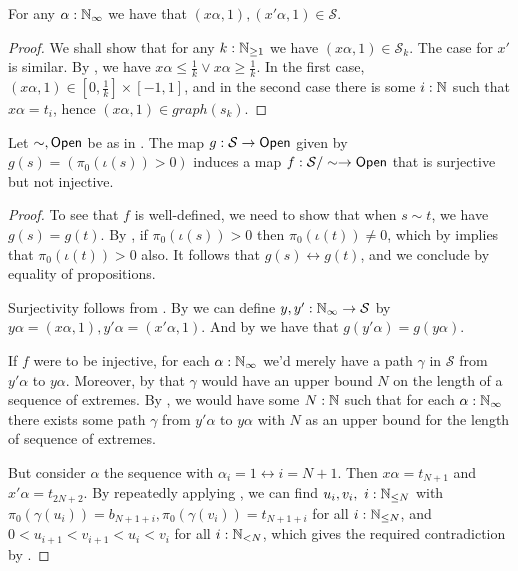 \begin{lemma}\label{sequenceLandsInS}
  For any $\alpha:\mathbb{N}_{\infty}$ we have that $(x\alpha,1),(x'\alpha,1) \in \mathcal S$.
\end{lemma}
\begin{proof}
  We shall show that for any $k:\mathbb{N}_{\geq1}$ we have $(x\alpha,1) \in \mathcal S_k$. The case for $x'$ is similar. 
  By , we have $x\alpha\leq \frac1k \vee x\alpha \geq \frac 1k$.
  In the first case, $(x\alpha,1) \in [0,\frac1k]\times [-1,1]$, and in the second case there is some $i:\mathbb{N}$ such that $x \alpha = t_i$, hence $(x\alpha,1)\in graph({s_k})$. 
\end{proof}
\begin{theorem}
  Let $\sim,\mathsf{Open}$ be as in . The map $g:\mathcal S \to \mathsf{Open}$ given by $g(s) = (\pi_0(\iota(s))>0)$ induces a map $f:\mathcal S/\sim \to \mathsf{Open}$ that is surjective but not injective. 
\end{theorem}
\begin{proof}
  To see that $f$ is well-defined, we need to show that when $s\sim t$, we have $g(s)=g(t)$. By , if $\pi_0(\iota(s))>0$ then $\pi_0(\iota(t)) \neq 0$, which by  implies that $\pi_0(\iota(t))>0$ also. It follows that $g(s)\leftrightarrow g(t)$, and we conclude by equality of propositions. 

  Surjectivity follows from . 
  By  we can define $y,y':\mathbb{N}_{\infty} \to \mathcal S$ by $y\alpha = (x\alpha,1),y'\alpha = (x'\alpha,1)$. And by  we have that $g(y'\alpha) = g(y\alpha)$. 
  
  If $f$ were to be injective, for each $\alpha:\mathbb{N}_{\infty}$ we'd merely have a path $\gamma$ in $\mathcal S$ from $y'\alpha$ to $y\alpha$. Moreover, by  that $\gamma$ would have an upper bound $N$ on the length of a sequence of extremes.
  By , we would have some $N:\mathbb{N}$ such that for each $\alpha:\mathbb{N}_{\infty}$ there exists some path $\gamma$ from $y'\alpha$ to $y\alpha$ with $N$ as an upper bound for the length of sequence of extremes.

  But consider $\alpha$ the sequence with $\alpha_i = 1\leftrightarrow i = N+1$. 
  Then $x\alpha = t_{N+1}$ and $x'\alpha = t_{2N+2}$. 
  By repeatedly applying , we can find $u_i,v_i,~i:\mathbb{N}_{\leq N}$ with 
  $\pi_0(\gamma(u_i)) = b_{N+1+i},\pi_0(\gamma(v_i)) = t_{N+1+i}$ for all $i:\mathbb{N}_{\leq N}$, and $0<u_{i+1}<v_{i+1}<u_i<v_i$ for all $i:\mathbb{N}_{<N}$,  which gives the required contradiction by . 
\end{proof}

